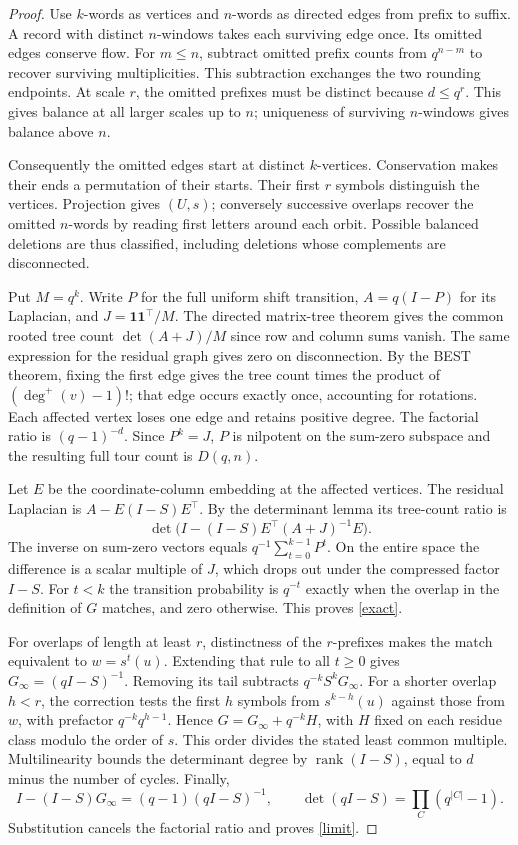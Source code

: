 \documentclass[11pt]{article}
\begin{document}
\begin{proof}
Use \(k\)-words as vertices and \(n\)-words as directed edges from prefix to suffix. A record with distinct \(n\)-windows takes each surviving edge once. Its omitted edges conserve flow. For \(m\le n\), subtract omitted prefix counts from \(q^{n-m}\) to recover surviving multiplicities. This subtraction exchanges the two rounding endpoints. At scale \(r\), the omitted prefixes must be distinct because \(d\le q^r\). This gives balance at all larger scales up to \(n\); uniqueness of surviving \(n\)-windows gives balance above \(n\).

Consequently the omitted edges start at distinct \(k\)-vertices. Conservation makes their ends a permutation of their starts. Their first \(r\) symbols distinguish the vertices. Projection gives \((U,s)\); conversely successive overlaps recover the omitted \(n\)-words by reading first letters around each orbit. Possible balanced deletions are thus classified, including deletions whose complements are disconnected.

Put \(M=q^k\). Write \(P\) for the full uniform shift transition, \(A=q(I-P)\) for its Laplacian, and \(J=\mathbf1\mathbf1^\top/M\). The directed matrix-tree theorem gives the common rooted tree count \(\det(A+J)/M\) since row and column sums vanish. The same expression for the residual graph gives zero on disconnection. By the BEST theorem, fixing the first edge gives the tree count times the product of \((\deg^+(v)-1)!\); that edge occurs exactly once, accounting for rotations. Each affected vertex loses one edge and retains positive degree. The factorial ratio is \((q-1)^{-d}\). Since \(P^k=J\), \(P\) is nilpotent on the sum-zero subspace and the resulting full tour count is \(D(q,n)\).

Let \(E\) be the coordinate-column embedding at the affected vertices. The residual Laplacian is \(A-E(I-S)E^\top\). By the determinant lemma its tree-count ratio is
\[
 \det\bigl(I-(I-S)E^\top(A+J)^{-1}E\bigr).
\]
The inverse on sum-zero vectors equals \(q^{-1}\sum_{t=0}^{k-1}P^t\). On the entire space the difference is a scalar multiple of \(J\), which drops out under the compressed factor \(I-S\). For \(t<k\) the transition probability is \(q^{-t}\) exactly when the overlap in the definition of \(G\) matches, and zero otherwise. This proves \eqref{exact}.

For overlaps of length at least \(r\), distinctness of the \(r\)-prefixes makes the match equivalent to \(w=s^t(u)\). Extending that rule to all \(t\ge0\) gives \(G_\infty=(qI-S)^{-1}\). Removing its tail subtracts \(q^{-k}S^kG_\infty\). For a shorter overlap \(h<r\), the correction tests the first \(h\) symbols from \(s^{k-h}(u)\) against those from \(w\), with prefactor \(q^{-k}q^{h-1}\). Hence \(G=G_\infty+q^{-k}H\), with \(H\) fixed on each residue class modulo the order of \(s\). This order divides the stated least common multiple. Multilinearity bounds the determinant degree by \(\operatorname{rank}(I-S)\), equal to \(d\) minus the number of cycles. Finally,
\[
 I-(I-S)G_\infty=(q-1)(qI-S)^{-1},
 \qquad \det(qI-S)=\prod_C(q^{|C|}-1).
\]
Substitution cancels the factorial ratio and proves \eqref{limit}.
\end{proof}
\end{document}
